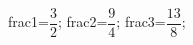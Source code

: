 \documentclass[exercice]{thedocument}%
\begin{document}
%
    \>frac1=$\dfrac32$;%
    \>frac2=$\dfrac94$;%
    \>frac3=$\dfrac{13}{8}$;%
\end{document}

